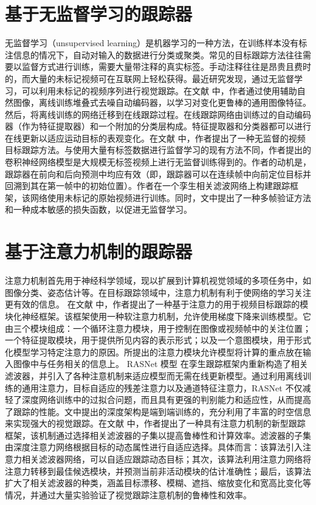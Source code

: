 \section{基于无监督学习的跟踪器}
无监督学习（unsupervised learning）是机器学习的一种方法，在训练样本没有标注信息的情况下，自动对输入的数据进行分类或聚类。常见的目标跟踪方法往往需要以监督方式进行训练，需要大量带注释的真实标签。手动注释往往是昂贵且费时的，而大量的未标记视频可在互联网上轻松获得。最近研究发现，通过无监督学习，可以利用未标记的视频序列进行视觉跟踪。在文献 \cite{wang2013learning} 中，作者通过使用辅助自然图像，离线训练堆叠式去噪自动编码器，以学习对变化更鲁棒的通用图像特征。然后，将离线训练的网络迁移到在线跟踪过程。在线跟踪网络由训练过的自动编码器（作为特征提取器）和一个附加的分类层构成。特征提取器和分类器都可以进行在线更新以适应运动目标的表观变化。在文献 \cite{wang2019unsupervised} 中，作者提出了一种无监督的视频目标跟踪方法。与使用大量有标签数据进行监督学习的现有方法不同，作者提出的卷积神经网络模型是大规模无标签视频上进行无监督训练得到的。作者的动机是，跟踪器在前向和后向预测中均应有效（即，跟踪器可以在连续帧中向前定位目标并回溯到其在第一帧中的初始位置）。作者在一个孪生相关滤波网络上构建跟踪框架，该网络使用未标记的原始视频进行训练。同时，文中提出了一种多帧验证方法和一种成本敏感的损失函数，以促进无监督学习。
\section{基于注意力机制的跟踪器}
注意力机制首先用于神经科学领域，现以扩展到计算机视觉领域的多项任务中，如图像分类、姿态估计等。在目标跟踪领域中，注意力机制有利于使网络的学习关注更有效的信息。
在文献 \cite{RATM} 中，作者提出了一种基于注意力的用于视频目标跟踪的模块化神经框架。该框架使用一种软注意力机制，允许使用梯度下降来训练模型。它由三个模块组成：一个循环注意力模块，用于控制在图像或视频帧中的关注位置；一个特征提取模块，用于提供所见内容的表示形式；以及一个意图模块，用于形式化模型学习特定注意力的原因。所提出的注意力模块允许模型将计算的重点放在输入图像中与任务相关的信息上。%
RASNet 模型 \cite{wang2018learning} 在孪生跟踪框架内重新构造了相关滤波器，并引入了各种注意机制来适应模型而无需在线更新模型。通过利用离线训练的通用注意力，目标自适应的残差注意力以及通道特征注意力，RASNet 不仅减轻了深度网络训练中的过拟合问题，而且具有更强的判别能力和适应性，从而提高了跟踪的性能。文中提出的深度架构是端到端训练的，充分利用了丰富的时空信息来实现强大的视觉跟踪。在文献 \cite{choi2017attentional} 中，作者提出了一种具有注意力机制的新型跟踪框架，该机制通过选择相关滤波器的子集以提高鲁棒性和计算效率。滤波器的子集由深度注意力网络根据目标的动态属性进行自适应选择。具体而言：该算法引入注意力相关滤波器网络，可以自适应跟踪动态目标；其次，该算法利用注意力网络将注意力转移到最佳候选模块，并预测当前非活动模块的估计准确性；最后，该算法扩大了相关滤波器的种类，涵盖目标漂移、模糊、遮挡、缩放变化和宽高比变化等情况，并通过大量实验验证了视觉跟踪注意机制的鲁棒性和效率。
